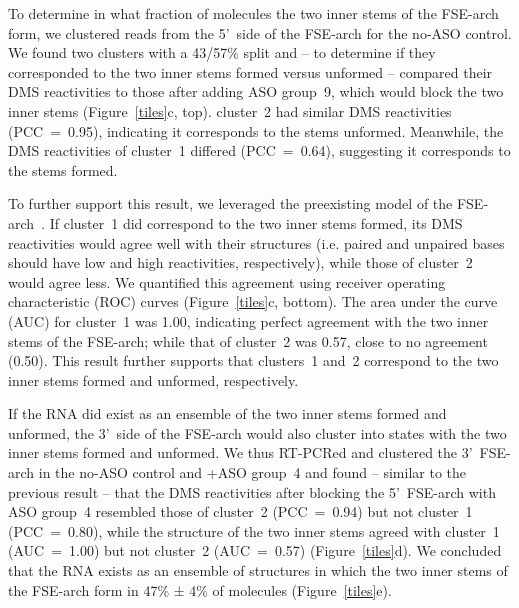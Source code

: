 \documentclass[main.tex]{subfiles}
\begin{document}
To determine in what fraction of molecules the two inner stems of the FSE-arch form, we clustered reads from the 5'~side of the FSE-arch for the no-ASO control.
We found two clusters with a 43/57\% split and -- to determine if they corresponded to the two inner stems formed versus unformed -- compared their DMS reactivities to those after adding ASO group~9, which would block the two inner stems (Figure~\ref{tiles}c, top).
cluster~2 had similar DMS reactivities (PCC~=~0.95), indicating it corresponds to the stems unformed.
Meanwhile, the DMS reactivities of cluster~1 differed (PCC~=~0.64), suggesting it corresponds to the stems formed.

To further support this result, we leveraged the preexisting model of the FSE-arch~\cite{Ziv2020}.
If cluster~1 did correspond to the two inner stems formed, its DMS reactivities would agree well with their structures (i.e. paired and unpaired bases should have low and high reactivities, respectively), while those of cluster~2 would agree less.
We quantified this agreement using receiver operating characteristic (ROC) curves (Figure~\ref{tiles}c, bottom).
The area under the curve (AUC) for cluster~1 was 1.00, indicating perfect agreement with the two inner stems of the FSE-arch; while that of cluster~2 was 0.57, close to no agreement (0.50).
This result further supports that clusters~1 and~2 correspond to the two inner stems formed and unformed, respectively.

If the RNA did exist as an ensemble of the two inner stems formed and unformed, the 3'~side of the FSE-arch would also cluster into states with the two inner stems formed and unformed.
We thus RT-PCRed and clustered the 3'~FSE-arch in the no-ASO control and +ASO group~4 and found -- similar to the previous result -- that the DMS reactivities after blocking the 5'~FSE-arch with ASO group~4 resembled those of cluster~2 (PCC~=~0.94) but not cluster~1 (PCC~=~0.80), while the structure of the two inner stems agreed with cluster~1 (AUC~=~1.00) but not cluster~2 (AUC~=~0.57) (Figure~\ref{tiles}d).
We concluded that the RNA exists as an ensemble of structures in which the two inner stems of the FSE-arch form in 47\% ± 4\% of molecules (Figure~\ref{tiles}e).
\end{document}
